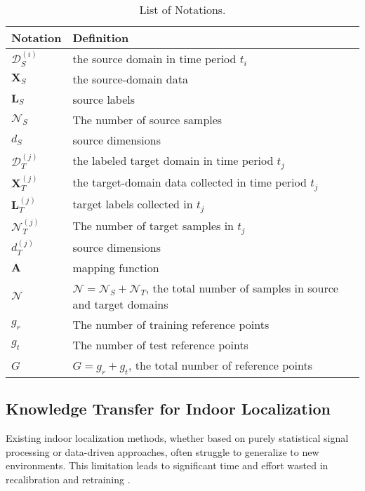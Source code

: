 \begin{table}[!t]
	\centering
	\caption{List of Notations.} %
	\label{List of Notations}
	\renewcommand{\arraystretch}{1.2} %
	\begin{tabular}{p{1.5cm} p{6.5cm}} %
		\toprule
		\textbf{Notation}   & \textbf{Definition} \\
		\midrule
		
		$\mathcal{D}_S^{\left( i \right)}$ & the source domain in time period $ t_i $  \\ 
		$\mathbf{X}_{S}$ & the source-domain data \\
		$\boldsymbol{L}_{S}$ & source labels \\
		$\mathcal{N}_S$ & The number of source samples \\
		$d_S$ & source dimensions \\
		\midrule
		
		$\mathcal{D}_{T}^{\left( j \right)}$ & the labeled target domain in time period $ t_j $ \\
		$\mathbf{X}_{T}^{\left( j \right)}$ & the target-domain data collected in time period $ t_j $\\
		$\boldsymbol{L}_{T}^{\left( j \right)}$ & target labels collected in $ t_j $\\
		$\mathcal{N}_{T}^{\left( j \right)}$ & The number of target samples in $ t_j $\\
		$d_{T}^{\left( j \right)}$ & source dimensions \\
		$\boldsymbol{A}$ & mapping function \\
		
		\midrule
		
		$\mathcal{N}$ & $\mathcal{N}=\mathcal{N}_S+\mathcal{N}_T$, the total number of samples in source and target domains \\
		$g_{r}$ & The number of training reference points \\
		$g_t$ & The number of test reference points \\
		$G$ & $ G=g_r+g_t $, the total number of reference points \\
		\bottomrule
	\end{tabular}
\end{table}

\subsection{Knowledge Transfer for Indoor Localization}
Existing indoor localization methods, whether based on purely statistical signal processing or data-driven approaches, often struggle to generalize to new environments. This limitation leads to significant time and effort wasted in recalibration and retraining \cite{xiang2022crowdsourcing,kerdjidj2024exploiting,chen2022fidora,prasad2023domain,gao2023metaloc}.

